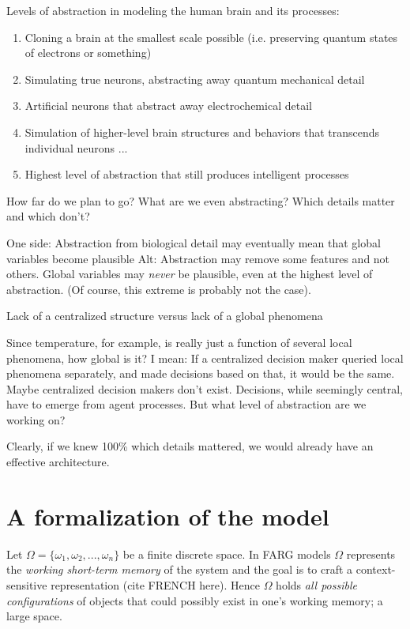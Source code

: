 Levels of abstraction in modeling the human brain and its processes:
\begin{enumerate}
	\item Cloning a brain at the smallest scale possible (i.e. preserving quantum states of electrons or something)
    \item Simulating true neurons, abstracting away quantum mechanical detail
    \item Artificial neurons that abstract away electrochemical detail
    \item Simulation of higher-level brain structures and behaviors that transcends individual neurons
    ...
    \item Highest level of abstraction that still produces intelligent processes
\end{enumerate}

How far do we plan to go? What are we even abstracting? Which details matter and which don't?

One side: Abstraction from biological detail may eventually mean that global variables become plausible
Alt: Abstraction may remove some features and not others. Global variables may \emph{never} be plausible, even at the highest level of abstraction. (Of course, this extreme is probably not the case).

Lack of a centralized structure versus lack of a global phenomena

Since temperature, for example, is really just a function of several local phenomena, how global is it? I mean: If a centralized decision maker queried local phenomena separately, and made decisions based on that, it would be the same. Maybe centralized decision makers don't exist. Decisions, while seemingly central, have to emerge from agent processes. But what level of abstraction are we working on? 

Clearly, if we knew 100\% which details mattered, we would already have an effective architecture.


\section{A formalization of the model}

Let $\Omega = \{\omega_1, \omega_2, ..., \omega_n\}$ be a finite discrete space.  In FARG models $\Omega$ represents the \emph{working short-term memory} of the system and the goal is to craft a context-sensitive representation (cite FRENCH here).  Hence $\Omega$ holds \emph{all possible configurations} of objects that could possibly exist in one's working memory; a large space. 

